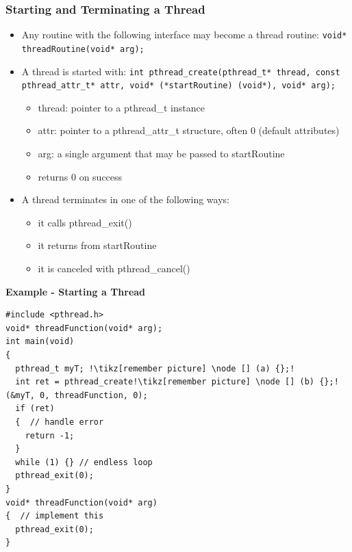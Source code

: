 \subsubsection{Starting and Terminating a Thread}
\begin{itemize}[noitemsep,topsep=0pt]
  \item Any routine with the following interface may become a thread routine: \lstinline{void* threadRoutine(void* arg);}
  \item A thread is started with:\newline
        \lstinline{int pthread_create(pthread_t* thread, const pthread_attr_t* attr, void* (*startRoutine) (void*), void* arg);}
        \begin{itemize}[noitemsep,topsep=0pt]
          \item thread: pointer to a pthread\_t instance
          \item attr: pointer to a pthread\_attr\_t structure, often 0 (default attributes)
          \item arg: a single argument that may be passed to startRoutine
          \item returns 0 on success
        \end{itemize}
  \item A thread terminates in one of the following ways:
        \begin{itemize}[noitemsep,topsep=0pt]
          \item it calls pthread\_exit()
          \item it returns from startRoutine
          \item it is canceled with pthread\_cancel()
        \end{itemize}
\end{itemize}

\textbf{Example - Starting a Thread}
\begin{lstlisting}[style=C, escapechar=!]
#include <pthread.h>
void* threadFunction(void* arg);
int main(void)
{
  pthread_t myT; !\tikz[remember picture] \node [] (a) {};!
  int ret = pthread_create!\tikz[remember picture] \node [] (b) {};!(&myT, 0, threadFunction, 0);
  if (ret)
  {  // handle error
    return -1;
  }
  while (1) {} // endless loop
  pthread_exit(0);
}
void* threadFunction(void* arg)
{  // implement this
  pthread_exit(0);
}
\end{lstlisting}

